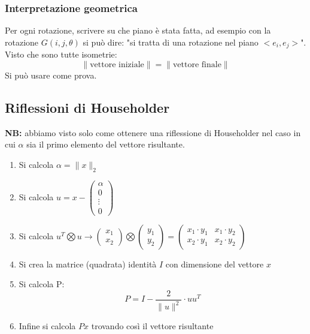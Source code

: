 \documentclass[10pt]{article}
\begin{document}
\subsubsection{Interpretazione geometrica}
Per ogni rotazione, scrivere su che piano è stata fatta, ad esempio con la rotazione $G(i,j,\theta)$ si può dire: "si tratta di una rotazione nel piano $<e_{i},e_{j}>$". Visto che sono tutte isometrie: \begin{equation*}
    \lVert \text{vettore iniziale} \rVert = \lVert \text{vettore finale} \rVert
\end{equation*}
Si può usare come prova.
\subsection{Riflessioni di Householder}
\textbf{NB:} abbiamo visto solo come ottenere una riflessione di Householder nel caso in cui $\alpha$ sia il primo elemento del vettore risultante.
\begin{enumerate}
    \item Si calcola $\alpha=\lVert x\rVert_{2}$
    \item Si calcola $u=x-\begin{pmatrix}
        \alpha \\ 0 \\ \vdots \\ 0
    \end{pmatrix}$
    \item Si calcola $u^{T}\bigotimes u \rightarrow \begin{pmatrix}
        x_{1} \\ x_{2}
    \end{pmatrix}\bigotimes\begin{pmatrix}
        y_{1} \\ y_{2}
    \end{pmatrix}=\begin{pmatrix}
        x_{1}\cdot y_{1} & x_{1}\cdot y_{2} \\
        x_{2}\cdot y_{1} & x_{2}\cdot y_{2}
    \end{pmatrix}$
    \item Si crea la matrice (quadrata) identità $I$ con dimensione del vettore $x$ 
    \item Si calcola P: \begin{equation*}
        P = I-\frac{2}{\lVert u\rVert^{2}}\cdot uu^{T}
    \end{equation*}
    \item Infine si calcola $Px$ trovando così il vettore risultante
\end{enumerate}
\end{document}
